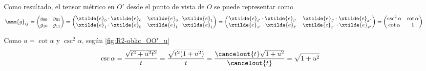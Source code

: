 Como resultado, el tensor métrico en $O'$ desde el punto de vista de $O$ se puede
representar como
{\small
  \[
    \mmm{g}_{ij}
    = \begin{pmatrix}
      g_{00} & g_{01}\\
      g_{10} & g_{11}
    \end{pmatrix}
    = \begin{pmatrix}
      \xtilde{e}_0\cdot\xtilde{e}_0 & \xtilde{e}_0\cdot\xtilde{e}_1\\
      \xtilde{e}_1\cdot\xtilde{e}_0 & \xtilde{e}_1\cdot\xtilde{e}_1
    \end{pmatrix}
    = \begin{pmatrix}
      \xtilde{e}_{t'}\cdot\xtilde{e}_{t'} & \xtilde{e}_{t'}\cdot\xtilde{e}_{x'}\\
      \xtilde{e}_{x'}\cdot\xtilde{e}_{t'} & \xtilde{e}_{x'}\cdot\xtilde{e}_{x'}
    \end{pmatrix}
    = \begin{pmatrix}
      \csc^2\alpha & \cot\alpha\\
      \cot\alpha & 1
    \end{pmatrix}
  \]
}

Como $u = \cot\alpha$ y $\csc^2\alpha$, según \ref{fig:R2-oblic_OO'_u}
\begin{align*}
  \csc\alpha
  &=
    \dfrac{\sqrt{t^2+u^2t^2}}{t}
    = \dfrac{\sqrt{t^2(1+u^2)}}{t}
    = \dfrac{\cancelout{t}\sqrt{1+u^2}}{\cancelout{t}}
    = \sqrt{1+u^2}
\end{align*}

